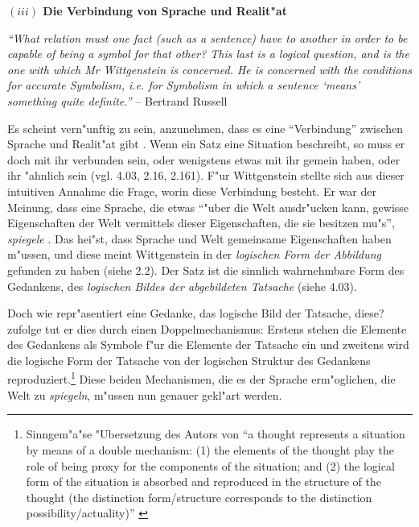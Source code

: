 \documentclass[a4paper, emulatestandardclasses, 12pt]{scrartcl}
\begin{document}
\begin{onehalfspace}
\vspace{5mm}
\noindent\textbf{$(iii)$ Die Verbindung von Sprache und Realit"at}	
\vspace{3mm}
\begin{addmargin}[.065\linewidth]{.065\linewidth}%
\footnotesize

\noindent \emph{"`What relation must one fact (such as a sentence) have to another in order to be capable of being a symbol for that other? This last is a logical question, and is the one with which Mr Wittgenstein is concerned. He is concerned with the conditions for accurate Symbolism, i.e. for Symbolism in which a sentence `means' something quite definite."'} -- Bertrand Russell \cite[S. 7]{wittgenstein1922tractatus}

\end{addmargin}
\normalsize
\vspace{3mm}

Es scheint vern"unftig zu sein, anzunehmen, dass es eine "`Verbindung"' zwischen Sprache und Realit"at gibt \cite[vgl.][S. 1 f.]{emiliani1999formsp}. Wenn ein Satz eine Situation beschreibt, so muss er doch mit ihr verbunden sein, oder wenigstens etwas mit ihr gemein haben, oder ihr "ahnlich sein (vgl. 4.03, 2.16, 2.161). F"ur Wittgenstein stellte sich aus dieser intuitiven Annahme die Frage, worin diese Verbindung besteht. Er war der Meinung, dass eine Sprache, die etwas "`"uber die Welt ausdr"ucken kann, gewisse Eigenschaften der Welt vermittels dieser Eigenschaften, die sie besitzen mu"s"', \emph{spiegele} \cite[siehe][S. 209]{wittgenstein1963tractatus}. Das hei"st, dass Sprache und Welt gemeinsame Eigenschaften haben m"ussen, und diese meint Wittgenstein in der \emph{logischen Form der Abbildung} gefunden zu haben (siehe 2.2). Der Satz ist die sinnlich wahrnehmbare Form des Gedankens, des \emph{logischen Bildes der abgebildeten Tatsache} (siehe 4.03).

Doch wie repr"asentiert eine Gedanke, das logische Bild der Tatsache, diese? \citet{frascolla2007understanding} zufolge tut er dies durch einen Doppelmechanismus: Erstens stehen die Elemente des Gedankens als Symbole f"ur die Elemente der Tatsache ein und zweitens wird die logische Form der Tatsache von der logischen Struktur des Gedankens reproduziert.\footnote{Sinngem"a"se "Ubersetzung des Autors von "`a thought represents a situation by means of a double mechanism: (1) the elements of the thought play the role of being proxy for the components of the situation; and (2) the logical form of the situation is absorbed and reproduced in the structure of the thought (the distinction form/structure corresponds to the distinction possibility/actuality)"' \cite[S.46]{frascolla2007understanding}} Diese beiden Mechanismen, die es der Sprache erm"oglichen, die Welt zu \emph{spiegeln}, m"ussen nun genauer gekl"art werden.


\end{onehalfspace}
\end{document}
